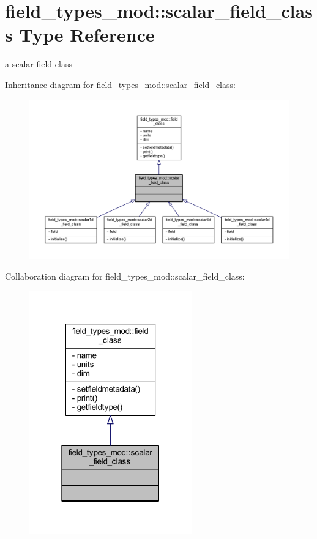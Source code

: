 \hypertarget{structfield__types__mod_1_1scalar__field__class}{}\section{field\+\_\+types\+\_\+mod\+:\+:scalar\+\_\+field\+\_\+class Type Reference}
\label{structfield__types__mod_1_1scalar__field__class}


a scalar field class  




Inheritance diagram for field\+\_\+types\+\_\+mod\+:\+:scalar\+\_\+field\+\_\+class\+:
\nopagebreak
\begin{figure}[H]
\begin{center}
\leavevmode
\includegraphics[width=350pt]{structfield__types__mod_1_1scalar__field__class__inherit__graph}
\end{center}
\end{figure}


Collaboration diagram for field\+\_\+types\+\_\+mod\+:\+:scalar\+\_\+field\+\_\+class\+:
\nopagebreak
\begin{figure}[H]
\begin{center}
\leavevmode
\includegraphics[width=199pt]{structfield__types__mod_1_1scalar__field__class__coll__graph}
\end{center}
\end{figure}


